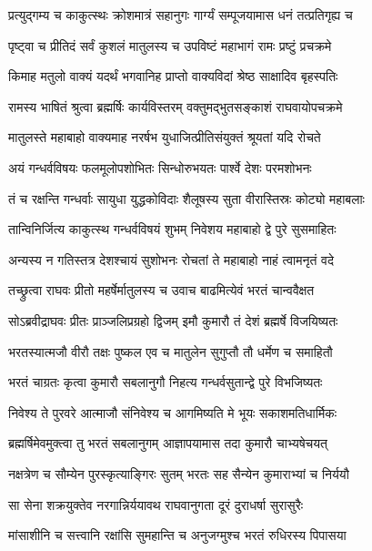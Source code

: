 \twolineshloka
{प्रत्युद्गम्य च काकुत्स्थः क्रोशमात्रं सहानुगः}
{गार्ग्यं सम्पूजयामास धनं तत्प्रतिगृह्य च} %

\twolineshloka
{पृष्ट्वा च प्रीतिदं सर्वं कुशलं मातुलस्य च}
{उपविष्टं महाभागं रामः प्रष्टुं प्रचक्रमे} %

\twolineshloka
{किमाह मतुलो वाक्यं यदर्थं भगवानिह}
{प्राप्तो वाक्यविदां श्रेष्ठ साक्षादिव बृहस्पतिः} %

\twolineshloka
{रामस्य भाषितं श्रुत्वा ब्रह्मर्षिः कार्यविस्तरम्}
{वक्तुमद्भुतसङ्काशं राघवायोपचक्रमे} %

\twolineshloka
{मातुलस्ते महाबाहो वाक्यमाह नरर्षभ}
{युधाजित्प्रीतिसंयुक्तं श्रूयतां यदि रोचते} %

\twolineshloka
{अयं गन्धर्वविषयः फलमूलोपशोभितः}
{सिन्धोरुभयतः पार्श्वे देशः परमशोभनः} %

\twolineshloka
{तं च रक्षन्ति गन्धर्वाः सायुधा युद्धकोविदाः}
{शैलूषस्य सुता वीरास्तिस्रः कोट्यो महाबलाः} %

\twolineshloka
{तान्विनिर्जित्य काकुत्स्थ गन्धर्वविषयं शुभम्}
{निवेशय महाबाहो द्वे पुरे सुसमाहितः} %

\twolineshloka
{अन्यस्य न गतिस्तत्र देशश्चायं सुशोभनः}
{रोचतां ते महाबाहो नाहं त्वामनृतं वदे} %

\twolineshloka
{तच्छ्रुत्वा राघवः प्रीतो महर्षेर्मातुलस्य च}
{उवाच बाढमित्येवं भरतं चान्ववैक्षत} %

\twolineshloka
{सोऽब्रवीद्राघवः प्रीतः प्राञ्जलिप्रग्रहो द्विजम्}
{इमौ कुमारौ तं देशं ब्रह्मर्षे विजयिष्यतः} %

\twolineshloka
{भरतस्यात्मजौ वीरौ तक्षः पुष्कल एव च}
{मातुलेन सुगुप्तौ तौ धर्मेण च समाहितौ} %

\twolineshloka
{भरतं चाग्रतः कृत्वा कुमारौ सबलानुगौ}
{निहत्य गन्धर्वसुतान्द्वे पुरे विभजिष्यतः} %

\twolineshloka
{निवेश्य ते पुरवरे आत्माजौ संनिवेश्य च}
{आगमिष्यति मे भूयः सकाशमतिधार्मिकः} %

\twolineshloka
{ब्रह्मर्षिमेवमुक्त्वा तु भरतं सबलानुगम्}
{आज्ञापयामास तदा कुमारौ चाभ्यषेचयत्} %

\twolineshloka
{नक्षत्रेण च सौम्येन पुरस्कृत्याङ्गिरः सुतम्}
{भरतः सह सैन्येन कुमाराभ्यां च निर्ययौ} %

\twolineshloka
{सा सेना शक्रयुक्तेव नरगान्निर्ययावथ}
{राघवानुगता दूरं दुराधर्षा सुरासुरैः} %

\twolineshloka
{मांसाशीनि च सत्त्वानि रक्षांसि सुमहान्ति च}
{अनुजग्मुश्च भरतं रुधिरस्य पिपासया} %

